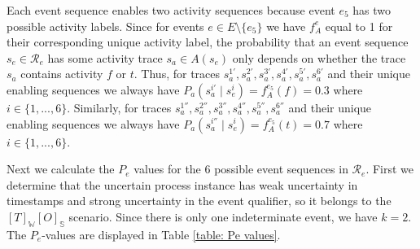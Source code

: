 Each event sequence enables two activity sequences because event $e_5$ has two possible activity labels.
Since for events $e \in E \setminus \{e_5\}$ we have $f_A^e$ equal to 1 for their corresponding unique activity label, the probability that an event sequence $s_e \in \mathcal{R}_e$ has some activity trace $s_a \in A(s_e)$ only depends on whether the trace $s_a$ contains activity $f$ or $t$.
Thus, for traces $s_a^{1'},s_a^{2'},s_a^{3'},s_a^{4'},s_a^{5'},s_a^{6'}$ and their unique enabling sequences we always have $P_a(s_a^{i'} \mid s_e^{i}) = f_A^{e_5}(f) = 0.3$ where $i \in \{1,...,6\}$.
Similarly, for traces $s_a^{1''},s_a^{2''},s_a^{3''},s_a^{4''},s_a^{5''},s_a^{6''}$ and their unique enabling sequences we always have $P_a(s_a^{i''} \mid s_e^{i}) = f_A^{e_5}(t) = 0.7$ where $i \in \{1,...,6\}$.

Next we calculate the $P_e$ values for the 6 possible event sequences in $\mathcal{R}_e$.
First we determine that the uncertain process instance has weak uncertainty in timestamps and strong uncertainty in the event qualifier, so it belongs to the $[T]_{\mathbb{W}}[O]_{\mathbb{S}}$ scenario.
Since there is only one indeterminate event, we have $k = 2$.
The $P_e$-values are displayed in Table \ref{table: Pe values}.

